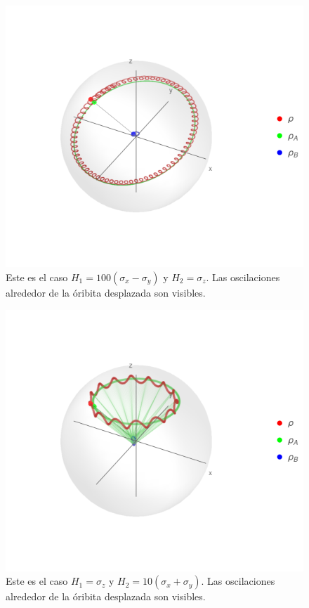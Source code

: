 \begin{figure}[h!]
    \centering
    \includegraphics[width=0.6\linewidth]{maxent/figures/U1xU2_H1=100(sx-sy)_H2=sz_z=0.9_p=0.85_sequence.png}
    \caption{Este es el caso $H_{1}=100(\sigma_{x}-\sigma_{y})$ y $H_{2}=\sigma_{z}$. Las oscilaciones alrededor de la óribita desplazada son visibles.}
    \label{fig:SmallP2}
\end{figure}

\begin{figure}[h!]
    \centering
    \includegraphics[width=0.6\linewidth]{maxent/figures/U1xU2_H1=sz_H2=10*(sx+sy)_z=0.9_p=0.85_sequence.png}
    \caption{Este es el caso $H_{1}=\sigma_{z}$ y $H_{2}=10(\sigma_{x}+\sigma_{y})$. Las oscilaciones alrededor de la óribita desplazada son visibles.}
    \label{fig:SmallP3}
\end{figure}


\newpage
